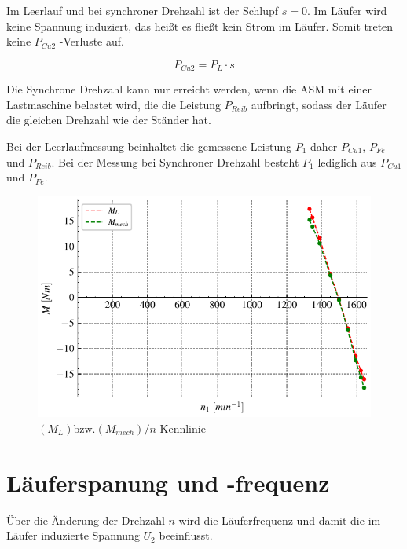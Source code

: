 \documentclass[conference]{IEEEtran}
\begin{document}
Im Leerlauf und bei synchroner Drehzahl ist der Schlupf $s=0$. Im Läufer wird
keine Spannung induziert, das heißt es fließt kein Strom im Läufer. Somit
treten keine $P_{Cu2}$ -Verluste auf.

\begin{equation} \label{eq:Kupfer2_verluste}
    P_{Cu2} = P_{L} \cdot s
\end{equation}

Die Synchrone Drehzahl kann nur erreicht werden, wenn die ASM mit einer
Lastmaschine belastet wird, die die Leistung $P_{Reib}$ aufbringt, sodass der
Läufer die gleichen Drehzahl wie der Ständer hat.

Bei der Leerlaufmessung beinhaltet die gemessene Leistung $P_{1}$ daher
$P_{Cu1}$, $P_{Fe}$ und $P_{Reib}$. Bei der Messung bei Synchroner Drehzahl
besteht $P_{1}$ lediglich aus $P_{Cu1}$ und $P_{Fe}$.




\begin{figure}[htbp]
    \centering
    \includegraphics[width=\columnwidth]{./figures/moment_ueber-n_vergleichen.pdf}
    \caption{$(M_L)\text{bzw.}(M_{mech})/n$ Kennlinie}
    \label{fig:M_L-mit-M_mech-vergleichen}
\end{figure}

\section{Läuferspanung und -frequenz}

Über die Änderung der Drehzahl $n$ wird die Läuferfrequenz und damit die im
Läufer induzierte Spannung $U_2$ beeinflusst.
\end{document}
